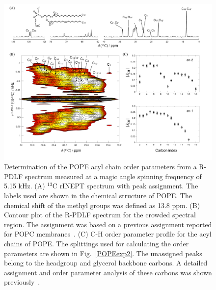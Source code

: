 \documentclass[fleqn,10pt]{wlscirep}
\begin{document}
\begin{figure}[h]
  \includegraphics[width=\textwidth]{Figures/POPE_INEPT_contour_SCH.pdf}
  \caption{Determination of the POPE acyl chain order parameters from a R-PDLF spectrum measured at a magic angle spinning frequency of 5.15 kHz. (A) $^{13}$C rINEPT spectrum with peak assignment. The labels used are shown in the chemical structure of POPE. The chemical shift of the methyl groups was defined as 13.8 ppm. (B) Contour plot of the R-PDLF spectrum for the crowded spectral region. The assignment was based on a previous assignment reported for POPC membranes~\cite{ferreira13}. (C) C-H order parameter profile for the acyl chains of POPE. The splittings used for calculating the order parameters are shown in Fig.~\ref{POPEexp2}. The unassigned peaks belong to the headgroup and glycerol backbone carbons. A detailed assignment and order parameter analysis of these carbons was shown previously~\cite{bacle21}.      }
  \label{POPEexp1}
\end{figure}
\end{document}
